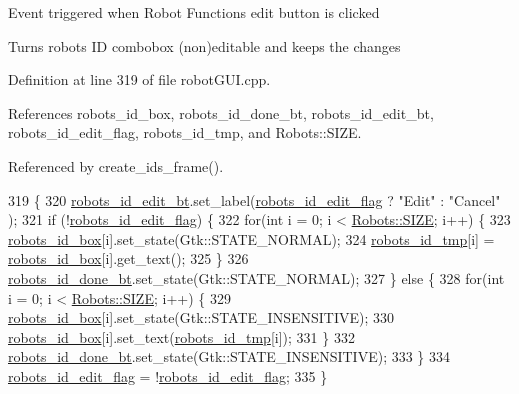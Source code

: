 Event triggered when Robot Functions\textquotesingle{} edit button is clicked

Turns robot\textquotesingle{}s ID combobox (non)editable and keeps the changes 

Definition at line 319 of file robot\+G\+U\+I.\+cpp.



References robots\+\_\+id\+\_\+box, robots\+\_\+id\+\_\+done\+\_\+bt, robots\+\_\+id\+\_\+edit\+\_\+bt, robots\+\_\+id\+\_\+edit\+\_\+flag, robots\+\_\+id\+\_\+tmp, and Robots\+::\+S\+I\+ZE.



Referenced by create\+\_\+ids\+\_\+frame().


\begin{DoxyCode}
319                                                       \{
320     \hyperlink{class_robot_g_u_i_aa74c3aa318e937124b6bd8cc1139ffbd}{robots\_id\_edit\_bt}.set\_label(\hyperlink{class_robot_g_u_i_a27cecf0c25aaf4ad01c712945008d4de}{robots\_id\_edit\_flag} ? \textcolor{stringliteral}{"Edit"} : \textcolor{stringliteral}{"Cancel"}
      );
321     \textcolor{keywordflow}{if} (!\hyperlink{class_robot_g_u_i_a27cecf0c25aaf4ad01c712945008d4de}{robots\_id\_edit\_flag}) \{
322         \textcolor{keywordflow}{for}(\textcolor{keywordtype}{int} i = 0; i < \hyperlink{class_robots_ae9df2f1d345ad6740f0459956cdd4712}{Robots::SIZE}; i++) \{
323             \hyperlink{class_robot_g_u_i_a1e475a8f99d5f0b3b29286731ddf0550}{robots\_id\_box}[i].set\_state(Gtk::STATE\_NORMAL);
324             \hyperlink{class_robot_g_u_i_ab5811cf4bb3982cdba9adf282eb52517}{robots\_id\_tmp}[i] = \hyperlink{class_robot_g_u_i_a1e475a8f99d5f0b3b29286731ddf0550}{robots\_id\_box}[i].get\_text();
325         \}
326         \hyperlink{class_robot_g_u_i_ab69f2927774ee6e1feef6e1e175bf5ba}{robots\_id\_done\_bt}.set\_state(Gtk::STATE\_NORMAL);
327     \} \textcolor{keywordflow}{else} \{
328         \textcolor{keywordflow}{for}(\textcolor{keywordtype}{int} i = 0; i < \hyperlink{class_robots_ae9df2f1d345ad6740f0459956cdd4712}{Robots::SIZE}; i++) \{
329             \hyperlink{class_robot_g_u_i_a1e475a8f99d5f0b3b29286731ddf0550}{robots\_id\_box}[i].set\_state(Gtk::STATE\_INSENSITIVE);
330             \hyperlink{class_robot_g_u_i_a1e475a8f99d5f0b3b29286731ddf0550}{robots\_id\_box}[i].set\_text(\hyperlink{class_robot_g_u_i_ab5811cf4bb3982cdba9adf282eb52517}{robots\_id\_tmp}[i]);
331         \}
332         \hyperlink{class_robot_g_u_i_ab69f2927774ee6e1feef6e1e175bf5ba}{robots\_id\_done\_bt}.set\_state(Gtk::STATE\_INSENSITIVE);
333     \}
334     \hyperlink{class_robot_g_u_i_a27cecf0c25aaf4ad01c712945008d4de}{robots\_id\_edit\_flag} = !\hyperlink{class_robot_g_u_i_a27cecf0c25aaf4ad01c712945008d4de}{robots\_id\_edit\_flag};
335 \}
\end{DoxyCode}
